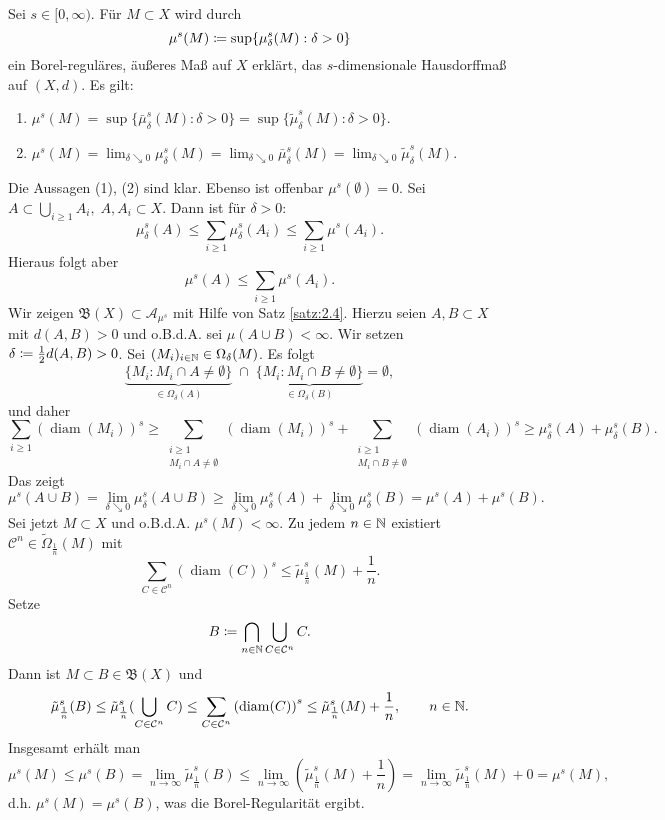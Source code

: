 \documentclass[a4paper,twoside,DIV15,BCOR12mm]{scrbook}
\newcommand{\borel}{\mathfrak B}
\DeclareMathOperator{\diam}{diam}
\DeclareMathOperator{\downto}{\searrow}
\begin{document}
\begin{satz}
\label{satz:2.20}

Sei \(s \in [0,\infty)\). Für \(M \subset X\) wird durch
\[
\mu^s(M) \da \sup\{\mu_\delta^s(M) : \delta > 0\}
\]
ein Borel-reguläres, äußeres Maß auf \(X\)  erklärt, das \(s\)-dimensionale Hausdorffmaß auf \((X,d)\). Es gilt:
\begin{enumerate}[(1)]
\item \(\mu^s(M) = \sup\{\bar\mu_\delta^s(M) : \delta > 0\} = \sup\{\tilde\mu_\delta^s(M) : \delta > 0\}\).
\item \(\mu^s(M) = \lim_{\delta \downto 0} \mu_\delta^s(M) = \lim_{\delta\downto0} \bar\mu_\delta^s(M) = \lim_{\delta\downto0} \tilde\mu_\delta^s(M)\).
\end{enumerate}

\end{satz}

\begin{beweis}
Die Aussagen (1), (2) sind klar. Ebenso ist offenbar \(\mu^s(\emptyset) = 0\). Sei \(A \subset \bigcup_{i\geq1} A_i,\;A,A_i\subset X\). Dann ist für \(\delta>0\):
\[
\mu_\delta^s(A) \leq \sum_{i\geq1} \mu_\delta^s(A_i) \leq \sum_{i\geq1} \mu^s(A_i).
\]
Hieraus folgt aber
\[
\mu^s(A) \leq \sum_{i\geq1} \mu^s(A_i).
\]
Wir zeigen \(\borel(X) \subset \mathcal{A}_{\mu^s}\) mit Hilfe von Satz \ref{satz:2.4}. Hierzu seien \(A,B \subset X\) mit $d(A,B)>0$ und o.B.d.A. sei \(\mu(A \cup B) < \infty\). Wir setzen \(\delta \da \frac12 d(A,B) > 0\). Sei \((M_i)_{i\in\mathbb{N}} \in \Omega_\delta(M)\). Es folgt
\[
\underbrace{\{ M_i : M_i \cap A \neq \emptyset \}}_{\in \Omega_\delta(A)}  \; \cap \; \underbrace{\{ M_i : M_i \cap B \neq \emptyset \}}_{\in \Omega_\delta(B)} = \emptyset,
\]
und daher
\[
\sum_{i\geq1} {(\diam(M_i))}^s \geq \sum_{\substack{i\geq1\\ M_i\cap A \neq\emptyset}} {(\diam(M_i))}^s + \sum_{\substack{i\geq1\\ M_i \cap B \neq \emptyset}} {(\diam(A_i))}^s \geq \mu_\delta^s(A) + \mu_\delta^s(B).
\]
Das zeigt
\[
\mu^s(A \cup B) = \lim_{\delta\downto0}\mu_\delta^s(A\cup B) \geq \lim_{\delta\downto0}\mu_\delta^s(A) + \lim_{\delta\downto0}\mu_\delta^s(B) = \mu^s(A)+\mu^s(B).
\]
Sei jetzt \(M \subset X\) und o.B.d.A. \(\mu^s(M)<\infty\). Zu jedem \(n\in\mathbb{N}\) existiert \(\mathcal{C}^n \in \tilde\Omega_{\frac1n}(M)\) mit 
$$
\sum_{C \in \mathcal{C}^n} {(\diam(C))}^s \leq \tilde\mu_{\frac1n}^s(M)+\frac1n.
$$
Setze
\[
B \da \bigcap_{n\in\MdN}\bigcup_{C\in\mathcal{C}^n}C.
\]
Dann ist \(M \subset B \in \borel(X)\) und 
$$
\tilde\mu^s_{\frac1n}(B) \leq \tilde\mu^s_{\frac1n}(\bigcup_{C\in\mathcal C^n}C) \leq \sum_{C\in\mathcal C^n} {(\diam(C))}^s \leq \tilde\mu^s_{\frac1n}(M)+\frac1n,\qquad  n\in\MdN.
$$
Insgesamt erhält man
$$
\mu^s(M) \leq \mu^s(B) = \lim_{n\rightarrow\infty} \tilde\mu^s_{\frac1n}(B) \leq \lim_{n\rightarrow\infty}(\tilde\mu^s_{\frac1n}(M)+\frac1n) = 
\lim_{n\rightarrow\infty} \tilde\mu^s_{\frac1n}(M) + 0 = \mu^s(M),
$$
d.h. \(\mu^s(M) = \mu^s(B)\), was die Borel-Regularität ergibt.
\end{beweis}
\end{document}
